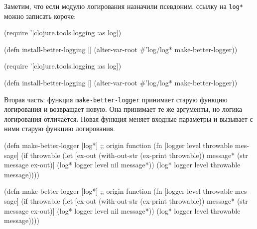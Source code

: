Заметим, что если модулю логирования назначили псевдоним, ссылку на \verb|log*|
можно записать короче:


\ifnarrow

\begin{english}
  \begin{clojure}
(require '[clojure.tools.logging :as log])

(defn install-better-logging []
  (alter-var-root
    #'log/log* make-better-logger))
  \end{clojure}
\end{english}

\else

\begin{english}
  \begin{clojure}
(require '[clojure.tools.logging :as log])

(defn install-better-logging []
  (alter-var-root #'log/log* make-better-logger))
  \end{clojure}
\end{english}

\fi

Вторая часть: функция \texttt{make-better-logger} принимает старую функцию
логирования и возвращает новую. Она принимает те же аргументы, но логика
логирования отличается. Новая функция меняет входные параметры и вызывает с ними
старую функцию логирования.

\ifnarrow


\begin{english}
  \begin{clojure/lines}
(defn make-better-logger
  [log*] ;; origin function
  (fn [logger level throwable message]
    (if throwable
      (let [ex-out (with-out-str (ex-print throwable))
            message* (str message \newline ex-out)]
        (log* logger level nil message*))
      (log* logger level throwable message))))
  \end{clojure/lines}
\end{english}

\else

\begin{english}
  \begin{clojure/lines}
(defn make-better-logger
  [log*] ;; origin function
  (fn [logger level throwable message]
    (if throwable
      (let [ex-out (with-out-str (ex-print throwable))
            message* (str message \newline ex-out)]
        (log* logger level nil message*))
      (log* logger level throwable message))))
  \end{clojure/lines}
\end{english}

